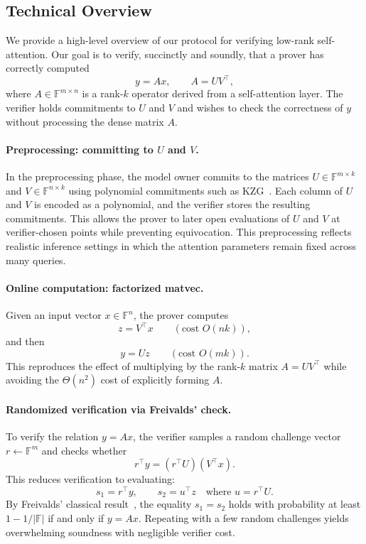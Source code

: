 \documentclass[11pt]{article}
\begin{document}
\subsection{Technical Overview}

We provide a high-level overview of our protocol for verifying 
low-rank self-attention.  
Our goal is to verify, succinctly and soundly, that a prover has 
correctly computed
\[
  y = A x, \qquad A = U V^\top,
\]
where $A \in \mathbb{F}^{m \times n}$ is a rank-$k$ operator derived 
from a self-attention layer.  
The verifier holds commitments to $U$ and $V$ and wishes to check 
the correctness of $y$ without processing the dense matrix $A$.

\vspace{0.7em}
\paragraph{Preprocessing: committing to $U$ and $V$.}
In the preprocessing phase, the model owner commits to the matrices 
$U \in \mathbb{F}^{m \times k}$ and $V \in \mathbb{F}^{n \times k}$ 
using polynomial commitments such as KZG~\cite{kate2010polynomial}.
Each column of $U$ and $V$ is encoded as a polynomial, 
and the verifier stores the resulting commitments.
This allows the prover to later open evaluations of $U$ and $V$ at 
verifier-chosen points while preventing equivocation.
This preprocessing reflects realistic inference settings in which the 
attention parameters remain fixed across many queries.

\vspace{0.7em}
\paragraph{Online computation: factorized matvec.}
Given an input vector $x \in \mathbb{F}^n$, the prover computes
\[
  z = V^\top x \qquad (\text{cost } O(nk)),
\]
and then
\[
  y = U z \qquad (\text{cost } O(mk)).
\]
This reproduces the effect of multiplying by the 
rank-$k$ matrix $A = U V^\top$ while avoiding the 
$\Theta(n^2)$ cost of explicitly forming $A$.

\vspace{0.7em}
\paragraph{Randomized verification via Freivalds' check.}
To verify the relation $y = A x$, the verifier samples a random 
challenge vector $r \leftarrow \mathbb{F}^m$ and checks whether
\[
  r^\top y = (r^\top U)(V^\top x).
\]
This reduces verification to evaluating:
\[
  s_1 = r^\top y, \qquad 
  s_2 = u^\top z \quad \text{where } u = r^\top U.
\]
By Freivalds' classical result~\cite{freivalds1979fast},
the equality $s_1 = s_2$ holds with probability at least 
$1 - 1/|\mathbb{F}|$ if and only if $y = A x$.
Repeating with a few random challenges yields overwhelming soundness 
with negligible verifier cost.
\end{document}
